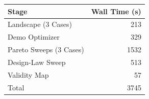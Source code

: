 \begin{tabular}{lr}
\toprule
Stage & Wall Time (s) \\
\midrule
Landscape (3 Cases) & 213 \\
Demo Optimizer & 329 \\
Pareto Sweeps (3 Cases) & 1532 \\
Design-Law Sweep & 513 \\
Validity Map & 57 \\
Total & 3745 \\
\bottomrule
\end{tabular}

